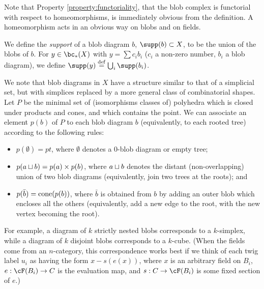 Note that Property \ref{property:functoriality}, that the blob complex is functorial with respect to homeomorphisms, 
is immediately obvious from the definition.
A homeomorphism acts in an obvious way on blobs and on fields.

We define the {\it support} of a blob diagram $b$, $\supp(b) \sub X$, 
to be the union of the blobs of $b$.
For $y \in \bc_*(X)$ with $y = \sum c_i b_i$ ($c_i$ a non-zero number, $b_i$ a blob diagram),
we define $\supp(y) \deq \bigcup_i \supp(b_i)$.

We note that blob diagrams in $X$ have a structure similar to that of a simplicial set,
but with simplices replaced by a more general class of combinatorial shapes.
Let $P$ be the minimal set of (isomorphisms classes of) polyhedra which is closed under products
and cones, and which contains the point.
We can associate an element $p(b)$ of $P$ to each blob diagram $b$ 
(equivalently, to each rooted tree) according to the following rules:
\begin{itemize}
\item $p(\emptyset) = pt$, where $\emptyset$ denotes a 0-blob diagram or empty tree;
\item $p(a \sqcup b) = p(a) \times p(b)$, where $a \sqcup b$ denotes the distant (non-overlapping) union 
of two blob diagrams (equivalently, join two trees at the roots); and
\item $p(\bar{b}) = \operatorname{cone}(p(b))$, where $\bar{b}$ is obtained from $b$ by adding an outer blob which 
encloses all the others (equivalently, add a new edge to the root, with the new vertex becoming the root).
\end{itemize}
For example, a diagram of $k$ strictly nested blobs corresponds to a $k$-simplex, while
a diagram of $k$ disjoint blobs corresponds to a $k$-cube.
(When the fields come from an $n$-category, this correspondence works best if we think of each twig label $u_i$ as having the form
$x - s(e(x))$, where $x$ is an arbitrary field on $B_i$, $e: \cF(B_i) \to C$ is the evaluation map, 
and $s:C \to \cF(B_i)$ is some fixed section of $e$.)


